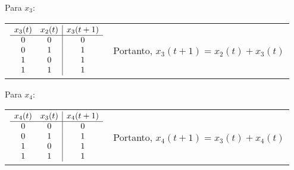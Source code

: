 \documentclass[12pt]{article}
\begin{document}
{\bigbreak
Para $x_3$:

\begin{tabular}{c l}
$\begin{array}{cc | c}
  x_3 (t) &  x_2 (t) & x_3 (t + 1) \\
  \hline
    0     &     0    &     0       \\
    0     &     1    &     1       \\
    1     &     0    &     1       \\
    1     &     1    &     1       
\end{array}$

&


Portanto, $x_3 (t + 1) = x_2 (t) + x_3 (t)$ 
\end{tabular}

\bigbreak
Para $x_4$: 

\begin{tabular}{c l}
$\begin{array}{cc | c}
  x_4 (t) &  x_3 (t) & x_4 (t + 1) \\
  \hline
    0     &     0    &     0       \\
    0     &     1    &     1       \\
    1     &     0    &     1       \\
    1     &     1    &     1       
\end{array}$

&


Portanto, $x_4 (t + 1) = x_3 (t) + x_4 (t)$ 
\end{tabular}
}
\end{document}
